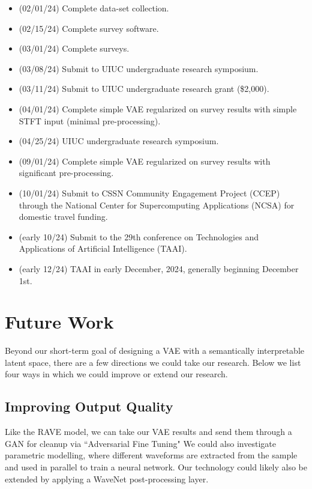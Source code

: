 \documentclass{article}
\begin{document}
\begin{itemize}
    \item (02/01/24) Complete data-set collection.
    \item (02/15/24) Complete survey software.
    \item (03/01/24) Complete surveys.
    \item (03/08/24) Submit to UIUC undergraduate research symposium.
    \item (03/11/24) Submit to UIUC undergraduate research grant (\$2,000).
    \item (04/01/24) Complete simple VAE regularized on survey results with simple STFT input (minimal pre-processing).
    \item (04/25/24) UIUC undergraduate research symposium.
    \item (09/01/24) Complete simple VAE regularized on survey results with significant pre-processing.
    \item (10/01/24) Submit to CSSN Community Engagement Project (CCEP) through the National Center for Supercomputing Applications (NCSA) for domestic travel funding.
    \item (early 10/24) Submit to the 29th conference on Technologies and Applications of Artificial Intelligence (TAAI).
    \item (early 12/24) TAAI in early December, 2024, generally beginning December 1st.
\end{itemize}


\section{Future Work}
Beyond our short-term goal of designing a VAE with a semantically interpretable latent space, there are a few directions we could take our research. Below we list four ways in which we could improve or extend our research. 

\subsection{Improving Output Quality}

Like the RAVE model, we can take our VAE results and send them through a GAN for cleanup via ``Adversarial Fine Tuning" \cite{Caillon2021} We could also investigate parametric modelling, where different waveforms are extracted from the sample and used in parallel to train a neural network. \cite{Subramani2020} Our technology could likely also be extended by applying a WaveNet post-processing layer. \cite{Kim2019}
\end{document}
